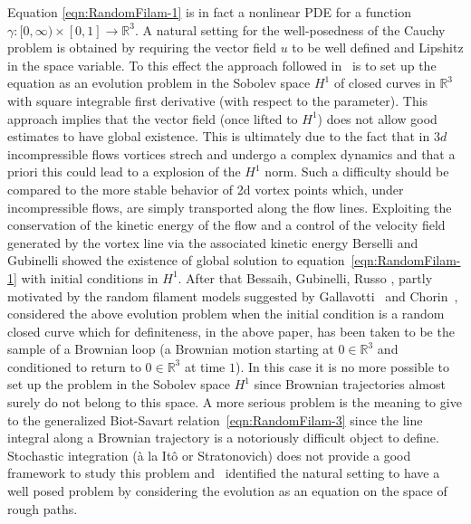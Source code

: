 \documentclass[11pt,a4paper,leqno]{amsart}%
\theoremstyle{plain}
\theoremstyle{remark}
\theoremstyle{plain}
\numberwithin{equation}{section}
\begin{document}
Equation \eqref{eqn:RandomFilam-1} is in fact  a nonlinear PDE for a function $\gamma: [0,\infty)\times[0,1]\to \mathbb{R}^3$. A natural setting for the  well-posedness of the  Cauchy problem is obtained by requiring  the vector field $u$ to be well defined and Lipshitz in the space variable.
To this effect the approach followed in~\cite{[Bers+Bess_2002]} is to set up the equation as an evolution problem in the Sobolev space $H^1$ of closed curves in $\mathbb{R}^3$ with square integrable first derivative (with respect to the parameter). This approach implies that the vector field (once lifted to $H^1$) does not allow good estimates to have global existence.
This is ultimately due to the fact that in $3d$ incompressible flows vortices strech and undergo a complex dynamics and that a priori this could lead to a explosion of the $H^1$ norm.
Such a difficulty should be compared to the more stable behavior of 2d vortex points which, under incompressible flows, are simply transported along the flow lines.
Exploiting the conservation of the kinetic energy of the flow and a control of the velocity field generated by the vortex line via the associated kinetic energy Berselli and  Gubinelli \cite{[Bers+Gub_2007]}  showed the existence of global solution to  equation~\eqref{eqn:RandomFilam-1} with initial conditions in $H^1$.
After that Bessaih, Gubinelli, Russo \cite{[Bess+Gub_2005]}, partly motivated by the random filament models suggested by Gallavotti~\cite{Gallavotti} and  Chorin~\cite{Chorin}, considered the above evolution problem when the initial condition is a random closed curve which for definiteness, in the above paper, has been taken to be the sample of a Brownian loop (a Brownian motion starting at $0\in\mathbb{R}^3$ and conditioned to return to $0\in\mathbb{R}^3$ at time $1$).
In this case it is no more possible to set up the problem in the Sobolev space $H^1$ since Brownian trajectories almost surely do not belong to this space. A more serious problem is the meaning to give to the generalized Biot-Savart relation~\eqref{eqn:RandomFilam-3} since the line integral along a Brownian trajectory is a notoriously difficult object to define. Stochastic integration (\`a la It\^o or Stratonovich) does not provide a good framework to study this problem and~\cite{[Bess+Gub_2005]} identified the natural setting to have a well posed problem by considering the evolution as an equation on the space of rough paths.
\end{document}
